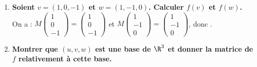 \documentclass[a4paper, 11pt,reqno]{article}
\begin{document}
\begin{correction}
\begin{enumerate}
		      $$ rg(M) = rg \left(\begin{array}{rrr}
					      1  & -1 & -1 \\
					      -2 & 0  & -2 \\
					      1  & 1  & 3
				      \end{array}\right)
			      \underset{\substack{ L_2 \leftarrow L_2 + 2L_1 \\  L_3 \leftarrow L_3-L_1}}{=}
			      rg \left(\begin{array}{rrr}
					      1 & -1 & -1 \\
					      0 & -2 & -4 \\
					      0 & 2  & 4
				      \end{array}\right)
			      \underset{ L_3 \leftarrow L_3 + L_2 }{=}
			      rg \left(\begin{array}{rrr}
					      1 & -1 & -1 \\
					      0 & -2 & -4 \\
					      0 & 0  & 0
				      \end{array}\right) = 2 .$$
		      Ainsi d'apr\`es le th\'eor\`eme du rang $rg(f) + \dim(\ker(f)) = \dim(\R^3)$, donc $\dim(\ker(f)) = 3-rg(M) = 1$. La famille $(u)$ est donc une famille libre \`a un seul \'el\'ement dans $\ker(f)$ qui est de dimension $1$, donc 
		\item \textbf{Soient $v=(1,0,-1)$ et $w=(1,-1,0)$. Calculer $f(v)$ et $f(w)$.}\\
		      On a : $M \left(\begin{array}{r} 1 \\ 0 \\ -1 \end{array}\right) = \left(\begin{array}{rrr}1 \\ 0 \\ -1\end{array}\right)$ et $M \left(\begin{array}{r} 1 \\ -1 \\ 0 \end{array}\right) =\left(\begin{array}{r} 1 \\ -1 \\ 0 \end{array}\right)$, donc .
		\item \textbf{Montrer que $(u,v,w)$ est une base de $\R^3$ et donner la matrice de $f$ relativement \`a cette base.}\\

\end{enumerate}
\end{correction}
\end{document}

